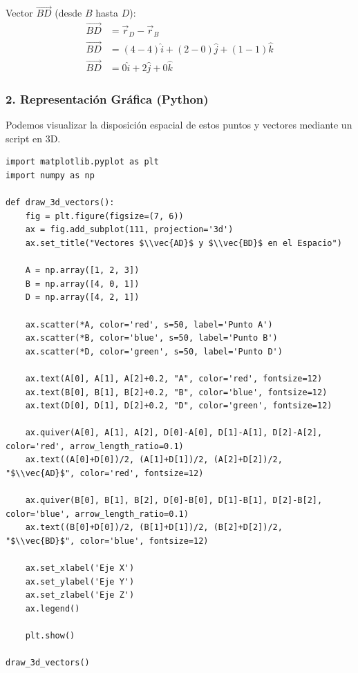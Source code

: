 \documentclass[12pt, a4paper]{article}
\begin{document}
Vector $\vec{BD}$ (desde $B$ hasta $D$):
\begin{align*}
    \vec{BD} &= \vec{r}_D - \vec{r}_B \\
    \vec{BD} &= (4 - 4)\hat{i} + (2 - 0)\hat{j} + (1 - 1)\hat{k} \\
    \vec{BD} &= 0\hat{i} + 2\hat{j} + 0\hat{k}
\end{align*}

\subsubsection*{2. Representación Gráfica (Python)}
Podemos visualizar la disposición espacial de estos puntos y vectores mediante un script en 3D.

\begin{lstlisting}
import matplotlib.pyplot as plt
import numpy as np

def draw_3d_vectors():
    fig = plt.figure(figsize=(7, 6))
    ax = fig.add_subplot(111, projection='3d')
    ax.set_title("Vectores $\\vec{AD}$ y $\\vec{BD}$ en el Espacio")
    
    A = np.array([1, 2, 3])
    B = np.array([4, 0, 1])
    D = np.array([4, 2, 1])
    
    ax.scatter(*A, color='red', s=50, label='Punto A')
    ax.scatter(*B, color='blue', s=50, label='Punto B')
    ax.scatter(*D, color='green', s=50, label='Punto D')
    
    ax.text(A[0], A[1], A[2]+0.2, "A", color='red', fontsize=12)
    ax.text(B[0], B[1], B[2]+0.2, "B", color='blue', fontsize=12)
    ax.text(D[0], D[1], D[2]+0.2, "D", color='green', fontsize=12)
    
    ax.quiver(A[0], A[1], A[2], D[0]-A[0], D[1]-A[1], D[2]-A[2], color='red', arrow_length_ratio=0.1)
    ax.text((A[0]+D[0])/2, (A[1]+D[1])/2, (A[2]+D[2])/2, "$\\vec{AD}$", color='red', fontsize=12)
    
    ax.quiver(B[0], B[1], B[2], D[0]-B[0], D[1]-B[1], D[2]-B[2], color='blue', arrow_length_ratio=0.1)
    ax.text((B[0]+D[0])/2, (B[1]+D[1])/2, (B[2]+D[2])/2, "$\\vec{BD}$", color='blue', fontsize=12)
    
    ax.set_xlabel('Eje X')
    ax.set_ylabel('Eje Y')
    ax.set_zlabel('Eje Z')
    ax.legend()
    
    plt.show()

draw_3d_vectors()
\end{lstlisting}
\end{document}
